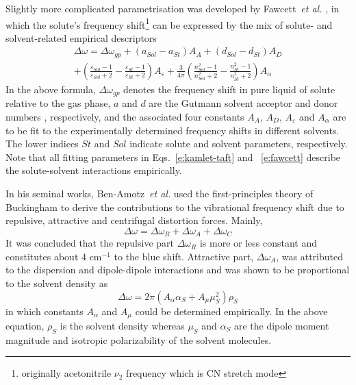 \documentclass[a4paper,titlepage,twoside,fleqn,12pt]{book}
\begin{document}
\begin{refsection}
Slightly more complicated parametrisation was developed 
by Fawcett~\emph{et al.} \citep{Reimers.Hall.JACS.1999,Fawcett.Liu.Kessler.JPC.1993,Fawcett.Kloss.JCP.1996},
in which the solute's frequency shift\footnote{originally acetonitrile $\nu_2$ frequency
which is CN stretch mode} can be expressed by the mix of solute- and
solvent-related empirical descriptors
%
\begin{multline} \label{e:fawcett}
\Delta \omega = \Delta \omega_{gp} + 
\left( a_{Sol} - a_{St} \right) A_A +
\left( d_{Sol} - d_{St} \right) A_D \\ + 
\left( \frac{\varepsilon_{Sol}-1}{\varepsilon_{Sol}+2} - \frac{\varepsilon_{St}-1}{\varepsilon_{St}+2} \right) A_\varepsilon +
\frac{3}{4\pi}
\left( \frac{n^2_{Sol}-1}{n^2_{Sol}+2} - \frac{n^2_{St}-1}{n^2_{St}+2} \right) A_\alpha
\end{multline}
%
In the above formula, $\Delta \omega_{gp}$ denotes the frequency shift in pure liquid of solute
relative to the gas phase,
$a$ and $d$ are the Gutmann solvent acceptor and donor numbers \citep{Gutmann.Resch.Linert.CoordChemRev.1982}, 
respectively,
and the associated four constants $A_A$, $A_D$, $A_\varepsilon$ and $A_\alpha$ 
are to be fit to the experimentally determined frequency shifts in different solvents.
The lower indices $St$ and $Sol$ indicate solute and solvent parameters, respectively. 
Note that all fitting parameters in Eqs.~\eqref{e:kamlet-taft} and ~\eqref{e:fawcett} 
describe the solute\hyp{}solvent interactions empirically.

In his seminal works, Ben\hyp{}Amotz~\emph{et al.} \citep{Ben-Amotz.Lee.Cho.List.JCP.1992} 
used the first\hyp{}principles theory of Buckingham \citep{Buckingham.ProcRSocLondonA.1958,
Buckingham.ProcRSocLondonA.1960,Buckingham.TransFaradaySoc.1960}
to derive the contributions to the vibrational frequency shift due to
repulsive, attractive and centrifugal distortion forces. Mainly,
%
\begin{equation} \label{e:ben-amotz}
 \Delta \omega = \Delta \omega_R + \Delta \omega_A + \Delta \omega_C
\end{equation}
%
It was concluded that the repulsive part $\Delta \omega_R$ is more or less constant
and constitutes about 4 cm$^{-1}$ to the blue shift. Attractive part, $\Delta \omega_A$,
was attributed to the dispersion and dipole\hyp{}dipole interactions
and was shown to be proportional to the solvent density as
%
\begin{equation} \label{e:ben-amotz-ro}
 \Delta \omega = 2\pi\left( A_\alpha \alpha_S + A_\mu \mu_S^2 \right) \rho_S
\end{equation}
%
in which constants $A_\alpha$ and $A_\mu$ could be determined empirically. 
In the above equation, $\rho_S$ is the solvent density whereas $\mu_S$ and $\alpha_S$ are the
dipole moment magnitude and isotropic polarizability of the solvent molecules.


\end{refsection}
\end{document}
